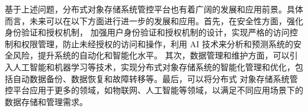 基于上述问题，分布式对象存储系统管控平台也有着广阔的发展和应用前景。具体而言，未来可以在以下方面进行进一步的发展和应用。首先，在安全性方面，强化身份验证和授权机制，
加强用户身份验证和授权机制的设计，实现严格的访问控制和权限管理，防止未经授权的访问和操作，利用 AI 技术来分析和预测系统的安全风险，提升系统的自动化和智能化水平。
其次，数据管理和维护方面，可以引入人工智能和机器学习等技术，实现分布式对象存储系统的智能化管理和优化，包括自动数据备份、数据恢复和故障转移等。最后，可以将分布式
对象存储系统管控平台应用于更多的领域，如物联网、人工智能等领域，以满足不同应用场景下的数据存储和管理需求。